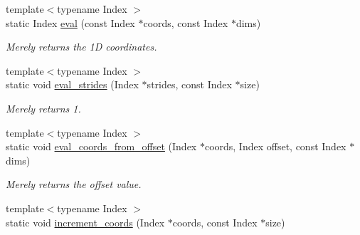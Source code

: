 \begin{DoxyCompactItemize}
\item 
\hypertarget{struct_d_o_1_1_offset_3_011_00_01_col_major_01_4_a1ffa69ab4cc1df64eaa174cfbfb1839d}{{\footnotesize template$<$typename Index $>$ }\\static Index \hyperlink{struct_d_o_1_1_offset_3_011_00_01_col_major_01_4_a1ffa69ab4cc1df64eaa174cfbfb1839d}{eval} (const Index $\ast$coords, const Index $\ast$dims)}\label{struct_d_o_1_1_offset_3_011_00_01_col_major_01_4_a1ffa69ab4cc1df64eaa174cfbfb1839d}

\begin{DoxyCompactList}\small\item\em Merely returns the 1\-D coordinates. \end{DoxyCompactList}\item 
\hypertarget{struct_d_o_1_1_offset_3_011_00_01_col_major_01_4_ad02911d67da0ad2bcf95bf5957f37553}{{\footnotesize template$<$typename Index $>$ }\\static void \hyperlink{struct_d_o_1_1_offset_3_011_00_01_col_major_01_4_ad02911d67da0ad2bcf95bf5957f37553}{eval\-\_\-strides} (Index $\ast$strides, const Index $\ast$size)}\label{struct_d_o_1_1_offset_3_011_00_01_col_major_01_4_ad02911d67da0ad2bcf95bf5957f37553}

\begin{DoxyCompactList}\small\item\em Merely returns 1. \end{DoxyCompactList}\item 
\hypertarget{struct_d_o_1_1_offset_3_011_00_01_col_major_01_4_a0b52d46c505c64599af0ed217401d2fe}{{\footnotesize template$<$typename Index $>$ }\\static void \hyperlink{struct_d_o_1_1_offset_3_011_00_01_col_major_01_4_a0b52d46c505c64599af0ed217401d2fe}{eval\-\_\-coords\-\_\-from\-\_\-offset} (Index $\ast$coords, Index offset, const Index $\ast$dims)}\label{struct_d_o_1_1_offset_3_011_00_01_col_major_01_4_a0b52d46c505c64599af0ed217401d2fe}

\begin{DoxyCompactList}\small\item\em Merely returns the offset value. \end{DoxyCompactList}\item 
\hypertarget{struct_d_o_1_1_offset_3_011_00_01_col_major_01_4_acbe7b75b289ed1e202180fd94a2a707c}{{\footnotesize template$<$typename Index $>$ }\\static void \hyperlink{struct_d_o_1_1_offset_3_011_00_01_col_major_01_4_acbe7b75b289ed1e202180fd94a2a707c}{increment\-\_\-coords} (Index $\ast$coords, const Index $\ast$size)}\label{struct_d_o_1_1_offset_3_011_00_01_col_major_01_4_acbe7b75b289ed1e202180fd94a2a707c}


\end{DoxyCompactItemize}
